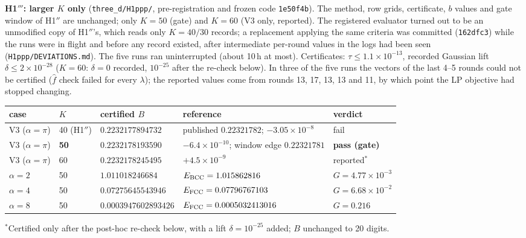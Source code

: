 \textbf{H1$'''$: larger $K$ only} (\texttt{three\_d/H1ppp/}, pre-registration and frozen code \texttt{1e50f4b}). The method,
row grids, certificate, $b$ values and gate window of H1$''$ are unchanged; only $K=50$ (gate) and $K=60$ (V3 only, reported).
The registered evaluator turned out to be an unmodified copy of H1$''$'s, which reads only $K=40/30$ records; a replacement
applying the same criteria was committed (\texttt{162dfc3}) while the runs were in flight and before any record existed, after
intermediate per-round values in the logs had been seen (\texttt{H1ppp/DEVIATIONS.md}). The five runs ran uninterrupted
(about 10\,h at most). Certificates: $\tau\le1.1\times10^{-13}$, recorded Gaussian lift $\delta\le2\times10^{-28}$ ($K=60$: $\delta=0$ recorded, $10^{-25}$ after the re-check below). In three of the five
runs the vectors of the last 4--5 rounds could not be certified ($\hat f$ check failed for every $\lambda$); the reported values come
from rounds 13, 17, 13, 13 and 11, by which point the LP objective had stopped changing.
\begin{center}\small
\begin{tabular}{lllll}\toprule
case & $K$ & certified $B$ & reference & verdict\\\midrule
V3 ($\alpha=\pi$) & 40 (H1$''$) & $0.2232177894732$ & published $0.22321782$; $-3.05\times10^{-8}$ & fail\\
V3 ($\alpha=\pi$) & \textbf{50} & $0.2232178193590$ & $-6.4\times10^{-10}$; window edge $0.22321781$ & \textbf{pass (gate)}\\
V3 ($\alpha=\pi$) & 60 & $0.2232178245495$ & $+4.5\times10^{-9}$ & reported$^{*}$\\\midrule
$\alpha=2$ & 50 & $1.011018246684$ & $E_{\rm BCC}=1.015862816$ & $G=4.77\times10^{-3}$\\
$\alpha=4$ & 50 & $0.07275645543946$ & $E_{\rm FCC}=0.07796767103$ & $G=6.68\times10^{-2}$\\
$\alpha=8$ & 50 & $0.0003947602893426$ & $E_{\rm FCC}=0.0005032413016$ & $G=0.216$\\\bottomrule
\end{tabular}
\end{center}
{\footnotesize $^{*}$Certified only after the post-hoc re-check below, with a lift $\delta=10^{-25}$ added; $B$ unchanged to 20 digits.}

